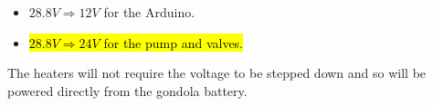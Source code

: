 \begin{centering}
\begin{itemize}
  \item $28.8V \Longrightarrow 12V$ for the Arduino.  
  \item \hl{$28.8V \Longrightarrow 24V$ for the pump and valves.}
  \end{itemize}

\end{centering}
\bigskip

\begin{centering}
The heaters will not require the voltage to be stepped down and so will be powered directly from the gondola battery.
\end{centering}
\bigskip


\raggedbottom